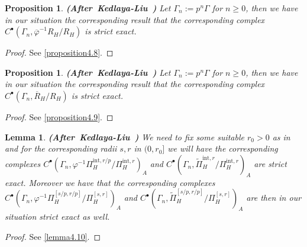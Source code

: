 \documentclass[12pt]{amsart}
\newtheorem{lemma}[theorem]{Lemma}
\newtheorem{proposition}[theorem]{Proposition}
\theoremstyle{definition}
\numberwithin{equation}{section}
\begin{document}
\begin{proposition} \mbox{\bf{(After Kedlaya-Liu \cite[Lemma 7.3.6]{KL16})}} 
Let $\Gamma_n:=p^n\Gamma$ for $n\geq 0$, then we have in our situation the corresponding result that the corresponding complex $C^\bullet(\Gamma_n,\overline{\varphi}^{-1}R_H/R_H)$ is strict exact.
\end{proposition}

\begin{proof}
See \cref{proposition4.8}.
\end{proof}


\begin{proposition} \mbox{\bf{(After Kedlaya-Liu \cite[Lemma 5.6.4]{KL16})}} 
Let $\Gamma_n:=p^n\Gamma$ for $n\geq 0$, then we have in our situation the corresponding result that the corresponding complex $C^\bullet(\Gamma_n,\overline{R}_H/R_H)$ is strict exact.
\end{proposition}

\begin{proof}
See \cref{proposition4.9}.
\end{proof}






\begin{lemma} \mbox{\bf{(After Kedlaya-Liu \cite[Corollary 5.6.5]{KL16})}} 
We need to fix some suitable $r_0>0$ as in \cite[Corollary 5.6.5]{KL16} and for the corresponding radii $s,r$ in $(0,r_0]$ we will have the corresponding complexes $C^\bullet(\Gamma_n,\varphi^{-1}\Pi^{\mathrm{int},r/p}_{H}/\Pi^{\mathrm{int},r}_{H})_A$ and $C^\bullet(\Gamma_n,\widetilde{\Pi}^{\mathrm{int},r}_{H}/\Pi^{\mathrm{int},r}_{H})_A$ are strict exact. Moreover we have that the corresponding complexes $C^\bullet(\Gamma_n,\varphi^{-1}\Pi^{[s/p,r/p]}_{H}/\Pi^{[s,r]}_{H})_A$ and $C^\bullet(\Gamma_n,\widetilde{\Pi}^{[s/p,r/p]}_{H}/\Pi^{[s,r]}_{H})_A$ are then in our situation strict exact as well.  	
\end{lemma}




\begin{proof}
See \cref{lemma4.10}.	
\end{proof}
\end{document}
